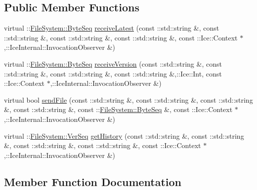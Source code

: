 \subsection*{Public Member Functions}
\begin{DoxyCompactItemize}
\item 
virtual \+::\hyperlink{namespace_file_system_a5c85de065f9c451ae1d1dea2dacb68c5}{File\+System\+::\+Byte\+Seq} \hyperlink{class_ice_delegate_m_1_1_file_system_1_1_file_a85aeef385bf8dd2fe91165096851f7a6}{receive\+Latest} (const \+::std\+::string \&, const \+::std\+::string \&, const \+::std\+::string \&, const \+::std\+::string \&, const \+::Ice\+::\+Context $\ast$,\+::Ice\+Internal\+::\+Invocation\+Observer \&)
\item 
virtual \+::\hyperlink{namespace_file_system_a5c85de065f9c451ae1d1dea2dacb68c5}{File\+System\+::\+Byte\+Seq} \hyperlink{class_ice_delegate_m_1_1_file_system_1_1_file_a561cf717ab881b9775a8f92993f74eac}{receive\+Version} (const \+::std\+::string \&, const \+::std\+::string \&, const \+::std\+::string \&, const \+::std\+::string \&,\+::Ice\+::\+Int, const \+::Ice\+::\+Context $\ast$,\+::Ice\+Internal\+::\+Invocation\+Observer \&)
\item 
virtual bool \hyperlink{class_ice_delegate_m_1_1_file_system_1_1_file_a47acd886ed6caae05e4ae93153e42104}{send\+File} (const \+::std\+::string \&, const \+::std\+::string \&, const \+::std\+::string \&, const \+::std\+::string \&, const \+::\hyperlink{namespace_file_system_a5c85de065f9c451ae1d1dea2dacb68c5}{File\+System\+::\+Byte\+Seq} \&, const \+::Ice\+::\+Context $\ast$,\+::Ice\+Internal\+::\+Invocation\+Observer \&)
\item 
virtual \+::\hyperlink{namespace_file_system_ac32dc1eb34c060160b52edc7c4e37d6e}{File\+System\+::\+Ver\+Seq} \hyperlink{class_ice_delegate_m_1_1_file_system_1_1_file_a00359ab8faf34bdc93ee409fb5f9242e}{get\+History} (const \+::std\+::string \&, const \+::std\+::string \&, const \+::std\+::string \&, const \+::std\+::string \&, const \+::Ice\+::\+Context $\ast$,\+::Ice\+Internal\+::\+Invocation\+Observer \&)
\end{DoxyCompactItemize}


\subsection{Member Function Documentation}
\hypertarget{class_ice_delegate_m_1_1_file_system_1_1_file_a00359ab8faf34bdc93ee409fb5f9242e}{}
